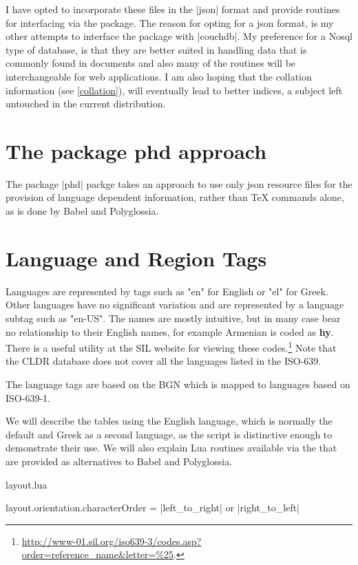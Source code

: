 I have opted to incorporate these files in the |json| format and provide routines for interfacing via the  package.  The reason for opting for a json format, is my other attempts to interface the package with |couchdb|.  My preference for a Nosql type of database, is that  they are better suited in handling data that is commonly  found in documents and also many of the routines will be interchangeable for web applications. I am also hoping that the collation information (see \ref{collation}), will eventually lead to better indices, a subject left untouched in the current distribution.

\section{The package phd approach}

The package |phd| packge takes an approach to use only json resource files for the provision of language dependent information, rather than TeX commands alone, as is done by Babel and Polyglossia. 

\section{Language and Region Tags}

Languages are represented by tags such as "en"  for English or "el" for Greek. Other languages have no significant variation and are represented by a language subtag such as "en-US".  The names are mostly intuitive, but in many case bear no relationship to their English names, for example Armenian is coded as \textbf{hy}. There is a useful utility at the SIL website for viewing these codes.\footnote{\protect\url{http://www-01.sil.org/iso639-3/codes.asp?order=reference_name&letter=\%25}.} Note that the CLDR database does not cover all the languages listed in the ISO-639.

The language tags are based on the BGN which is mapped to languages based on ISO-639-1. 

We will describe the tables using the English language, which is normally the default and Greek as a second language, as the script is distinctive enough to demonstrate their use. We will also explain Lua routines available via the  that are provided as alternatives to Babel and Polyglossia.


{layout.lua}

{layout.orientation.characterOrder} = |left_to_right| or |right_to_left|


